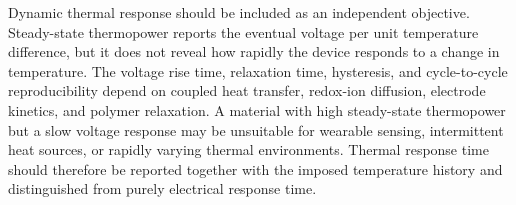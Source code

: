 Dynamic thermal response should be included as an independent objective.
Steady-state thermopower reports the eventual voltage per unit temperature
difference, but it does not reveal how rapidly the device responds to a change
in temperature. The voltage rise time, relaxation time, hysteresis, and
cycle-to-cycle reproducibility depend on coupled heat transfer, redox-ion
diffusion, electrode kinetics, and polymer relaxation. A material with high
steady-state thermopower but a slow voltage response may be unsuitable for
wearable sensing, intermittent heat sources, or rapidly varying thermal
environments. Thermal response time should therefore be reported together with
the imposed temperature history and distinguished from purely electrical
response time.

